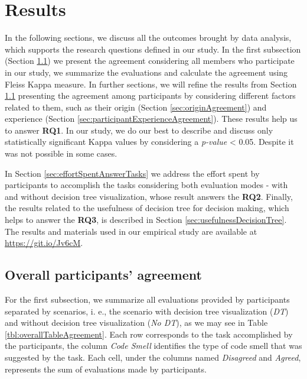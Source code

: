 \chapter{Results}
\label{sec:results}

In the following sections, we discuss all the outcomes brought by data analysis, which supports the research questions defined in our study. In the first subsection (Section \ref{sec:overalAgreement}) we present the agreement considering all members who participate in our study, we summarize the evaluations and calculate the agreement using Fleiss Kappa measure. In further sections, we will refine the results from Section \ref{sec:overalAgreement} presenting the agreement among participants by considering different factors related to them, such as their origin (Section \ref{sec:originAgreement}) and experience (Section \ref{sec:participantExperienceAgreement}). These results help us to answer \textbf{RQ1}. In our study, we do our best to describe and discuss only statistically significant Kappa values by considering a \textit{p-value} < 0.05. Despite it was not possible in some cases.

In Section \ref{sec:effortSpentAnswerTasks} we address the effort spent by participants to accomplish the tasks considering both evaluation modes - with and without decision tree visualization, whose result answers the  \textbf{RQ2}. Finally, the results related to the usefulness of decision tree for decision making, which helps to answer the \textbf{RQ3}, is described in Section \ref{sec:usefulnessDecisionTree}. The results and materials used in our empirical study are available at \hyperlink{https://git.io/Jv6cM}{https://git.io/Jv6cM}.

\section{Overall participants' agreement} \label{sec:overalAgreement}

For the first subsection, we summarize all evaluations provided by participants separated by scenarios, i. e., the scenario with decision tree visualization (\textit{DT}) and without decision tree visualization (\textit{No DT}), as we may see in Table \ref{tbl:overallTableAgreement}. Each row corresponds to the task accomplished by the participants, the column \textit{Code Smell} identifies the type of code smell that was suggested by the task. Each cell, under the columns named \textit{Disagreed} and \textit{Agreed}, represents the sum of evaluations made by participants.

